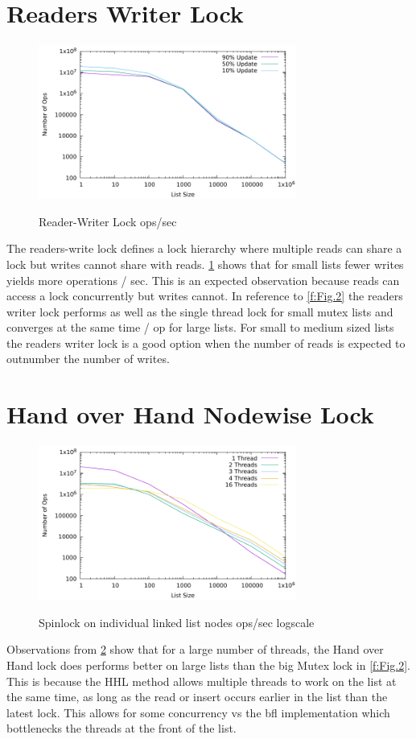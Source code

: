 \documentclass{article}
\begin{document}
\section{Readers Writer Lock}
	\begin{figure}[h]
		\centering
		\includegraphics[height=2in]{outputData/bfl_rw.pdf}
		\label{f:Fig.4}
		\caption{Reader-Writer Lock ops/sec}
	\end{figure}
The readers-write lock defines a lock hierarchy where multiple reads can share a lock but 
writes cannot share with reads. \ref{f:Fig.4} shows that for small lists fewer writes yields 
more operations / sec. This is an expected observation because reads can access a lock 
concurrently but writes cannot. In reference to \ref{f:Fig.2} the readers 
writer lock performs as well as the single thread lock for small mutex lists and converges 
at the same time / op for large lists. For small to medium sized lists the readers writer 
lock is a good option when the number of reads is expected to outnumber the number of 
writes.  

\section{Hand over Hand Nodewise Lock}
	\begin{figure}[h]
		\centering
		\includegraphics[height=2in]{outputData/hhl.pdf}
		\label{f:Fig.5}
		\caption{Spinlock on individual linked list nodes ops/sec logscale}
	\end{figure}
Observations from \ref{f:Fig.5} show that for a large number of threads, the Hand over 
Hand lock does performs better on large lists than the big Mutex lock in \ref{f:Fig.2}. 
This is because the HHL method allows multiple threads to work on the list at the same 
time, as long as the read or insert occurs earlier in the list than the latest lock. 
This allows for some concurrency vs the bfl implementation which bottlenecks the threads 
at the front of the list. 
\end{document}
